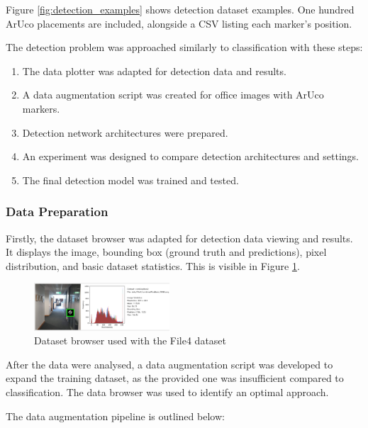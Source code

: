 \documentclass[conference]{IEEEtran}
\begin{document}
Figure \ref{fig:detection_examples} shows detection dataset examples. One hundred ArUco placements are included, alongside 
a CSV listing each marker's position.

The detection problem was approached similarly to classification with these steps: 

\begin{enumerate}
  \item The data plotter was adapted for detection data and results.
  \item A data augmentation script was created for office images with ArUco markers.
  \item Detection network architectures were prepared.
  \item An experiment was designed to compare detection architectures and settings.
  \item The final detection model was trained and tested.
\end{enumerate}

\subsubsection{Data Preparation}

Firstly, the dataset browser was adapted for detection data viewing and results. It displays the image, bounding box (ground
truth and predictions), pixel distribution, and basic dataset statistics. This is visible in Figure \ref{fig:data_browser_2}.

\begin{figure}[h]
  \centering
  \includegraphics[width=0.45\textwidth]{images/aruco-dataset-browser-2.png}
  \caption{Dataset browser used with the File4 dataset}
  \label{fig:data_browser_2}
\end{figure}

After the data were analysed, a data augmentation script was developed to expand the training dataset, as the provided one was
insufficient compared to classification. The data browser was used to identify an optimal approach.

The data augmentation pipeline is outlined below:
\end{document}
